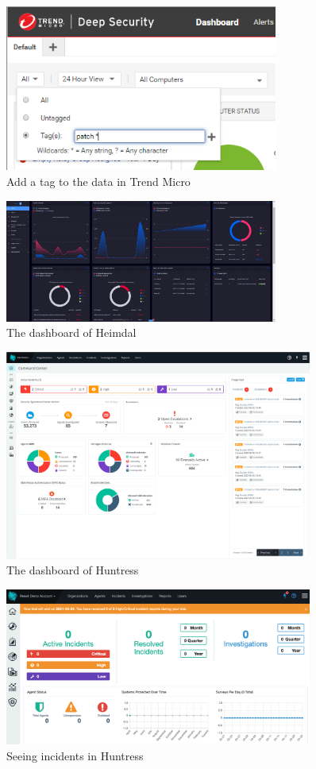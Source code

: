 \begin{figure}[htbp]
      \centering
      \includegraphics[width=0.8\textwidth]{Figures/Trend Micro/path.png}
      \caption{Add a tag to the data in Trend Micro}
\end{figure}

\begin{figure}[htbp]
      \centering
      \includegraphics[width=0.8\textwidth]{Figures/Heimdal/Home.png}
      \caption{The dashboard of Heimdal\textregistered{}}
\end{figure}

\begin{figure}[htbp]
      \centering
      \includegraphics[width=0.9\textwidth]{Figures/Huntress/dashboard.png}
      \caption{The dashboard of Huntress}
\end{figure}

\begin{figure}[htbp]
      \centering
      \includegraphics[width=0.9\textwidth]{Figures/Huntress/incidents.png}
      \caption{Seeing incidents in Huntress}
\end{figure}